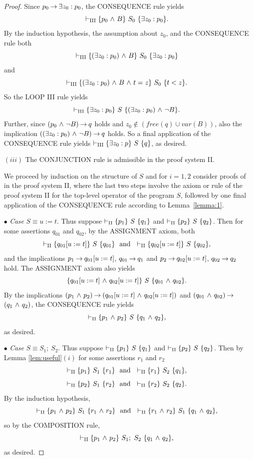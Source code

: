 \documentclass[runningheads]{llncs}       %
\begin{document}
\begin{proof}
Since $p_0 \mbox{$\:\rightarrow\:$} \mbox{$\exists$} z_0: p_0$, the CONSEQUENCE rule yields
\[
 \vdash_{\rm{III}} \mbox{$\{{p_{0} \mbox{$\ \wedge\ $} B}\}\ {S_0}\ \{{\mbox{$\exists$} z_0: p_{0}}\}$}.
\]
By the induction hypothesis, the assumption about $z_0$,
and the CONSEQUENCE rule both
\[
 \vdash_{\rm{III}} \mbox{$\{{(\mbox{$\exists$} z_0:p_0) \mbox{$\ \wedge\ $} B}\}\ {S_0}\ \{{\mbox{$\exists$} z_0: p_{0}}\}$}
\]
and
\[
 \vdash_{\rm{III}} \mbox{$\{{(\mbox{$\exists$} z_0:p_0) \mbox{$\ \wedge\ $} B \mbox{$\ \wedge\ $} t = z}\}\ {S_0}\ \{{t < z}\}$}.
\]
So the LOOP III rule yields 
\[
 \vdash_{\rm{III}} \mbox{$\{{\mbox{$\exists$} z_0:p_0}\}\ {S}\ \{{(\mbox{$\exists$} z_0:p_0) \mbox{$\ \wedge\ $} \neg B}\}$}.
\]
Further, since $(p_{0} \mbox{$\ \wedge\ $} \neg B) \mbox{$\:\rightarrow\:$} q$ holds and
$z_0 \not\in (\mathit{free(q)} \cup var(B))$, also the implication
$((\mbox{$\exists$} z_0:p_0) \mbox{$\ \wedge\ $} \neg B) \mbox{$\:\rightarrow\:$} q$ holds.  So a final application of the
CONSEQUENCE rule yields $\vdash_{\rm{III}} \mbox{$\{{\mbox{$\exists$} z_0:p}\}\ {S}\ \{{q}\}$}$, as
desired.

\III

\NI
$(iii)$ The {\rm CONJUNCTION} rule is admissible in the proof system {\rm II}.

We proceed by induction on the structure of $S$
and for $i=1,2$ consider proofs of  in the proof system \rm{II}, where 
the last two steps involve the axiom or rule of the proof system \rm{II} 
for the top-level operator of the program $S$, 
followed by one final application of the CONSEQUENCE rule
according to Lemma~\ref{lemma:1}.

\III

\NI
$\bullet$ \emph{Case} $S \equiv u:=t$.
Thus suppose $\vdash_{\rm{II}} \mbox{$\{{p_1}\}\ {S}\ \{{q_1}\}$}$ and
$\vdash_{\rm{II}} \mbox{$\{{p_2}\}\ {S}\ \{{q_2}\}$}$.
Then for some assertions $q_{01}$ and $q_{02}$,
by the ASSIGNMENT axiom, both
\[
 \vdash_{\rm{II}} \HT{q_{01}[u:=t]}{S}{q_{01}} \ \mbox{ and }\
 \vdash_{\rm{II}} \HT{q_{02}[u:=t]}{S}{q_{02}},
\]
and the implications 
$p_1 \mbox{$\:\rightarrow\:$} q_{01}[u:=t]$, $q_{01} \mbox{$\:\rightarrow\:$} q_1$ and
$p_2 \mbox{$\:\rightarrow\:$} q_{02}[u:=t]$, $q_{02} \mbox{$\:\rightarrow\:$} q_2$ hold.
The ASSIGNMENT axiom also yields
\[
 \mbox{$\{{q_{01}[u:=t] \mbox{$\ \wedge\ $} q_{02}[u:=t]}\}\ {S}\ \{{q_{01} \mbox{$\ \wedge\ $} q_{02}}\}$}.
\]
By the implications 
$(p_1 \mbox{$\ \wedge\ $} p_2) \mbox{$\:\rightarrow\:$} (q_{01}[u:=t] \mbox{$\ \wedge\ $} q_{02}[u:=t])$ and 
$(q_{01} \mbox{$\ \wedge\ $} q_{02}) \mbox{$\:\rightarrow\:$}$ $(q_1 \mbox{$\ \wedge\ $} q_2)$,
the CONSEQUENCE rule yields
\[
  \vdash_{\rm{II}} \mbox{$\{{p_1 \mbox{$\ \wedge\ $} p_2}\}\ {S}\ \{{q_1 \mbox{$\ \wedge\ $} q_2}\}$},
\]
as desired.

\III

\NI
$\bullet$ \emph{Case} $S \equiv S_1 ;\ S_2$.
Thus suppose $\vdash_{\rm{II}} \mbox{$\{{p_1}\}\ {S}\ \{{q_1}\}$}$ and
$\vdash_{\rm{II}} \mbox{$\{{p_2}\}\ {S}\ \{{q_2}\}$}$.
Then by Lemma \ref{lem:useful}$(i)$ for some assertions $r_1$ and $r_2$
\[
 \vdash_{\rm{II}} \HT{p_{1}}{S_1}{r_1} \ \mbox{ and }\ 
 \vdash_{\rm{II}} \HT{r_1}{S_2}{q_{1}},
\]
\[
 \vdash_{\rm{II}} \mbox{$\{{p_{2}}\}\ {S_1}\ \{{r_2}\}$} \ \mbox{ and }\
 \vdash_{\rm{II}} \mbox{$\{{r_2}\}\ {S_2}\ \{{q_{2}}\}$}.
\]
By the induction hypothesis,
\[
 \vdash_{\rm{II}} \mbox{$\{{p_1 \mbox{$\ \wedge\ $} p_2}\}\ {S_1}\ \{{r_1 \mbox{$\ \wedge\ $} r_2}\}$} \ \mbox{ and }\
 \vdash_{\rm{II}} \mbox{$\{{r_1 \mbox{$\ \wedge\ $} r_2}\}\ {S_1}\ \{{q_1 \mbox{$\ \wedge\ $} q_2}\}$},
\]
so by the COMPOSITION rule,
\[
  \vdash_{\rm{II}} \mbox{$\{{p_1 \mbox{$\ \wedge\ $} p_2}\}\ {S_1;\ S_2}\ \{{q_1 \mbox{$\ \wedge\ $} q_2}\}$},
\]
as desired.


\end{proof}
\end{document}
